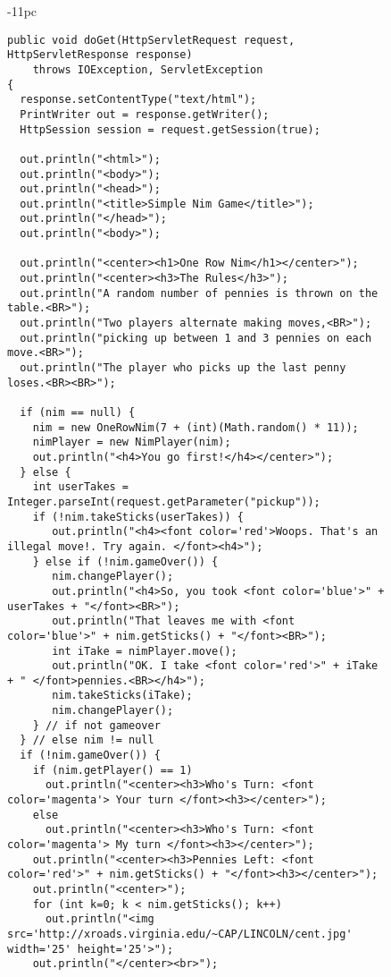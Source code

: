 \begin{figure}[p]
\jjjprogstart
\begin{jjjlistingleft}[37pc]{-11pc}
\begin{lstlisting}[basicstyle=\scriptsize]
public void doGet(HttpServletRequest request, HttpServletResponse response)
    throws IOException, ServletException
{
  response.setContentType("text/html");
  PrintWriter out = response.getWriter();
  HttpSession session = request.getSession(true);

  out.println("<html>");
  out.println("<body>");
  out.println("<head>");
  out.println("<title>Simple Nim Game</title>");
  out.println("</head>");
  out.println("<body>");

  out.println("<center><h1>One Row Nim</h1></center>");
  out.println("<center><h3>The Rules</h3>");
  out.println("A random number of pennies is thrown on the table.<BR>");
  out.println("Two players alternate making moves,<BR>");
  out.println("picking up between 1 and 3 pennies on each move.<BR>");
  out.println("The player who picks up the last penny loses.<BR><BR>");

  if (nim == null) {
    nim = new OneRowNim(7 + (int)(Math.random() * 11));
    nimPlayer = new NimPlayer(nim);
    out.println("<h4>You go first!</h4></center>");
  } else {
    int userTakes = Integer.parseInt(request.getParameter("pickup"));
    if (!nim.takeSticks(userTakes)) {
       out.println("<h4><font color='red'>Woops. That's an illegal move!. Try again. </font><h4>");
    } else if (!nim.gameOver()) {
       nim.changePlayer();
       out.println("<h4>So, you took <font color='blue'>" + userTakes + "</font><BR>"); 
       out.println("That leaves me with <font color='blue'>" + nim.getSticks() + "</font><BR>");
       int iTake = nimPlayer.move();
       out.println("OK. I take <font color='red'>" + iTake + " </font>pennies.<BR></h4>");
       nim.takeSticks(iTake);
       nim.changePlayer();
    } // if not gameover
  } // else nim != null
  if (!nim.gameOver()) {
    if (nim.getPlayer() == 1)
      out.println("<center><h3>Who's Turn: <font color='magenta'> Your turn </font><h3></center>");
    else
      out.println("<center><h3>Who's Turn: <font color='magenta'> My turn </font><h3></center>");
    out.println("<center><h3>Pennies Left: <font color='red'>" + nim.getSticks() + "</font><h3></center>");
    out.println("<center>");
    for (int k=0; k < nim.getSticks(); k++)
      out.println("<img src='http://xroads.virginia.edu/~CAP/LINCOLN/cent.jpg' width='25' height='25'>");
    out.println("</center><br>");


\end{lstlisting}
\end{jjjlistingleft}
\end{figure}

